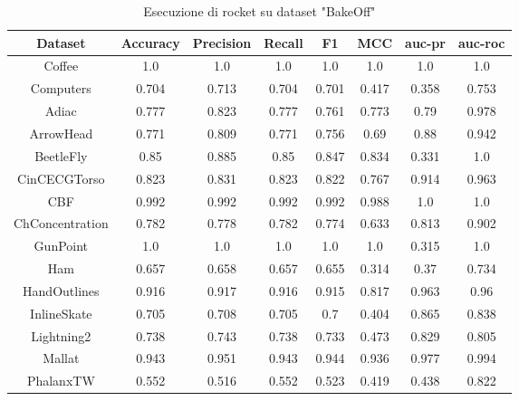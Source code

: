 \begin{table}[h]
    \centering
    \begin{tabular}{|c|c|c|c|c|c|c|c|}
    \hline
         \textbf{Dataset} & \textbf{Accuracy} &\textbf{Precision}  & \textbf{Recall} & \textbf{F1} & \textbf{MCC} & \textbf{auc-pr} & \textbf{auc-roc}\\
        \hline
        Coffee &1.0&1.0 & 1.0& 1.0& 1.0& 1.0& 1.0\\
         \hline
         Computers& 0.704& 0.713& 0.704& 0.701& 0.417& 0.358& 0.753\\
         \hline
         Adiac&0.777 &0.823 &0.777 &0.761 & 0.773& 0.79& 0.978\\
         \hline
         ArrowHead&0.771 &0.809 &0.771 &0.756 &0.69 &0.88 &0.942 \\
         \hline
         BeetleFly&0.85 &0.885 &0.85 &0.847 &0.834 &0.331 &1.0 \\
         \hline
         CinCECGTorso& 0.823& 0.831& 0.823& 0.822& 0.767& 0.914& 0.963\\
         \hline
         CBF& 0.992& 0.992& 0.992& 0.992&0.988 &1.0 &1.0 \\
         \hline
         ChConcentration&0.782 &0.778 &0.782 &0.774 &0.633 &0.813 &0.902 \\
         \hline
         GunPoint&1.0 &1.0 &1.0 &1.0 &1.0 & 0.315&1.0 \\
         \hline
         Ham&0.657 &0.658 &0.657 &0.655 &0.314 &0.37 &0.734 \\
         \hline
         HandOutlines&0.916 &0.917 & 0.916&0.915 & 0.817&0.963 &0.96 \\
         \hline
         InlineSkate&0.705 &0.708 & 0.705&0.7 & 0.404&0.865 &0.838 \\
         \hline
         Lightning2&0.738 &0.743 & 0.738&0.733 & 0.473&0.829 &0.805 \\
         \hline
         Mallat&0.943 &0.951 & 0.943&0.944 & 0.936&0.977 &0.994 \\
         \hline
         PhalanxTW& 0.552 &0.516 & 0.552&0.523 & 0.419&0.438 &0.822 \\
         \hline
    \end{tabular}
    \label{tab:Rocket_paper}
    \caption{Esecuzione di rocket su dataset "BakeOff"}
\end{table}